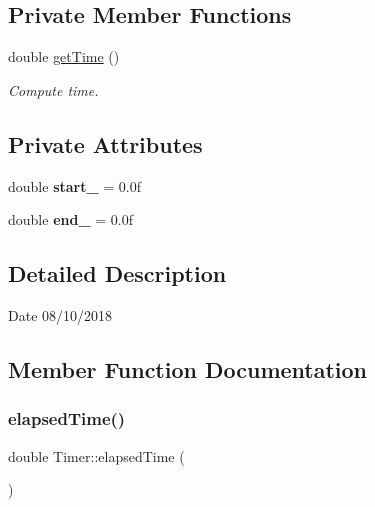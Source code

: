 \subsection*{Private Member Functions}
\begin{DoxyCompactItemize}
\item 
double \mbox{\hyperlink{class_timer_a490604efc23a4ff9bef8d1f9f418ecb2}{get\+Time}} ()
\begin{DoxyCompactList}\small\item\em Compute time. \end{DoxyCompactList}\end{DoxyCompactItemize}
\subsection*{Private Attributes}
\begin{DoxyCompactItemize}
\item 
\mbox{\label{class_timer_a9d2980c578cca73cd2edfa1b9654ee15}} 
double {\bfseries start\+\_\+} = 0.\+0f
\item 
\mbox{\label{class_timer_a8adf5f4711b2464f589fc3ad12905c38}} 
double {\bfseries end\+\_\+} = 0.\+0f
\end{DoxyCompactItemize}


\subsection{Detailed Description}
\begin{DoxyDate}{Date}
08/10/2018 
\end{DoxyDate}


\subsection{Member Function Documentation}
\mbox{\label{class_timer_a034b4f311dbba1ba6ace1af3cf7c6f97}} 
\subsubsection{\texorpdfstring{elapsed\+Time()}{elapsedTime()}}
{\footnotesize\ttfamily double Timer\+::elapsed\+Time (\begin{DoxyParamCaption}{ }\end{DoxyParamCaption})\hspace{0.3cm}{\ttfamily [inline]}}



